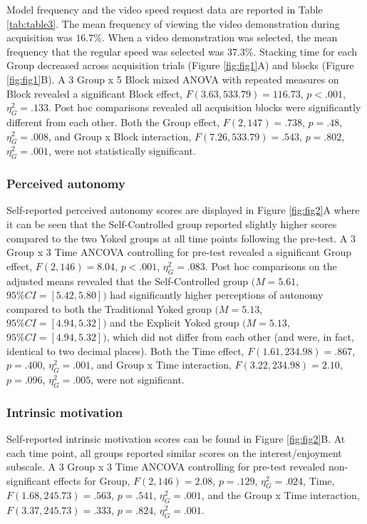 \documentclass[
  english,
  man, donotrepeattitle,floatsintext]{apa7}
\begin{document}
Model frequency and the video speed request data are reported in Table \ref{tab:table3}. The mean frequency of viewing the video demonstration during acquisition was \(16.7\%\). When a video demonstration was selected, the mean frequency that the regular speed was selected was \(37.3\%\). Stacking time for each Group decreased across acquisition trials (Figure \ref{fig:fig1}A) and blocks (Figure \ref{fig:fig1}B). A 3 Group x 5 Block mixed ANOVA with repeated measures on Block revealed a significant Block effect, \(F(3.63,533.79) = 116.73\), \(p < .001\), \(\eta^2_{G} = .133\). Post hoc comparisons revealed all acquisition blocks were significantly different from each other. Both the Group effect, \(F(2,147) = .738\), \(p = .48\), \(\eta^2_{G} = .008\), and Group x Block interaction, \(F(7.26,533.79) = .543\), \(p = .802\), \(\eta^2_{G} = .001\), were not statistically significant.

\hypertarget{perceived-autonomy}{%
\subsubsection{Perceived autonomy}\label{perceived-autonomy}}

Self-reported perceived autonomy scores are displayed in Figure \ref{fig:fig2}A where it can be seen that the Self-Controlled group reported slightly higher scores compared to the two Yoked groups at all time points following the pre-test. A 3 Group x 3 Time ANCOVA controlling for pre-test revealed a significant Group effect, \(F(2,146) = 8.04\), \(p < .001\), \(\eta^2_{G} = .083.\) Post hoc comparisons on the adjusted means revealed that the Self-Controlled group \((M = 5.61\), \(95\%CI =[5.42,5.80])\) had significantly higher perceptions of autonomy compared to both the Traditional Yoked group \((M = 5.13\), \(95\%CI = [4.94,5.32])\) and the Explicit Yoked group \((M = 5.13\), \(95\%CI = [4.94,5.32])\), which did not differ from each other (and were, in fact, identical to two decimal places). Both the Time effect, \(F(1.61,234.98) = .867\), \(p = .400\), \(\eta^2_{G} = .001\), and Group x Time interaction, \(F(3.22,234.98) = 2.10\), \(p = .096\), \(\eta^2_{G} = .005\), were not significant.

\hypertarget{intrinsic-motivation}{%
\subsubsection{Intrinsic motivation}\label{intrinsic-motivation}}

Self-reported intrinsic motivation scores can be found in Figure \ref{fig:fig2}B. At each time point, all groups reported similar scores on the interest/enjoyment subscale. A 3 Group x 3 Time ANCOVA controlling for pre-test revealed non-significant effects for Group, \(F(2,146) = 2.08\), \(p = .129\), \(\eta^2_{G} = .024\), Time, \(F(1.68,245.73) = .563\), \(p = .541\), \(\eta^2_{G} = .001\), and the Group x Time interaction, \(F(3.37,245.73) = .333\), \(p = .824\), \(\eta^2_{G} = .001\).
\end{document}
